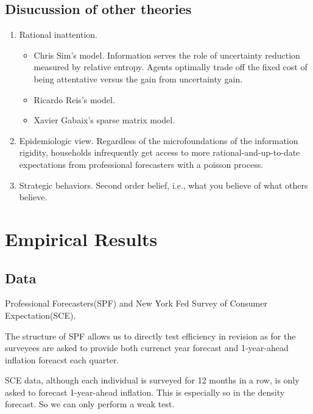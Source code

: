 \documentclass[]{article}
\begin{document}
\subsection{Disucussion of other theories}

\begin{enumerate}
\item Rational inattention. 
\begin{itemize}
	\item Chris Sim's model.\cite{sims2003implications} Information serves the role of uncertainty reduction measured by relative entropy. Agents optimally trade off the fixed cost of being attentative versus the gain from uncertainty gain.   
	\item Ricardo Reis's model. \cite{reis2006inattentive}
	\item Xavier Gabaix's sparse matrix model. \cite{gabaix2014sparsity}
\end{itemize}

\item Epidemiologic view. \cite{carroll2003macroeconomic} Regardless of the microfoundations of the information rigidity, households infrequently get access to more rational-and-up-to-date expectations from professional forecasters with a poisson process. 


\item Strategic behaviors. Second order belief, i.e., what you believe of what others believe. \cite{angeletos2009incomplete}



\end{enumerate}

\section{Empirical Results}

\subsection{Data}


Professional Forecasters(SPF) and New York Fed Survey of Consumer Expectation(SCE). 

The structure of SPF allows us to directly test efficiency in revision as for the surveyees are asked to provide both currenct year forecast and 1-year-ahead inflation foreacst each quarter. 

SCE data, although each individual is surveyed for 12 months in a row, is only asked to forecast 1-year-ahead inflation. This is especially so in the density forecast. So we can only perform a weak test. 
\end{document}
